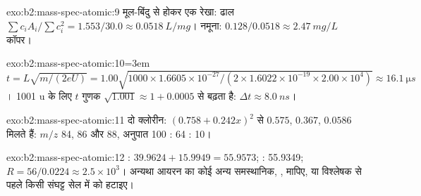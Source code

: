 \begin{solution}{exo:b2:mass-spec-atomic:9}
मूल-बिंदु से होकर एक रेखा: ढाल $\sum c_iA_i/\sum c_i^2 = 1.553/30.0 \approx \qty{0.0518}{L/mg}$। नमूना:
$0.128/0.0518 \approx \qty{2.47}{mg/L}$ कॉपर।
\end{solution}

\begin{solution}{exo:b2:mass-spec-atomic:10}\emergencystretch=3em
$t = L\sqrt{m/(2eU)} = 1.00\sqrt{1000 \times 1.6605 \times 10^{-27}/(2 \times 1.6022 \times 10^{-19}
\times 2.00 \times 10^4)} \approx \qty{16.1}{\micro s}$। 1001 u के लिए $t$ गुणक
$\sqrt{1.001} \approx 1 + 0.0005$ से बढ़ता है: $\Delta t \approx \qty{8.0}{ns}$।
\end{solution}

\begin{solution}{exo:b2:mass-spec-atomic:11}
दो क्लोरीन: $(0.758 + 0.242x)^2$ से $0.575$, $0.367$, $0.0586$ मिलते हैं: $m/z$ 84, 86 और 88, अनुपात
100 : 64 : 10।
\end{solution}

\begin{solution}{exo:b2:mass-spec-atomic:12}
: $39.9624 + 15.9949 = 55.9573$; : 55.9349; $R = 56/0.0224 \approx 2.5 \times
10^3$। अन्यथा आयरन का कोई अन्य समस्थानिक, , मापिए, या विश्लेषक से पहले किसी संघट्ट सेल में
 को हटाइए।
\end{solution}

